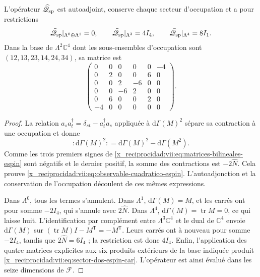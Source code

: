 \begin{proposition}
\label{x_reciprocidad:vii:prop:operador-espin-car}
L'opérateur \(\widehat{\mathscr Q}_{\rm sp}\) est autoadjoint,
conserve chaque secteur d'occupation et a pour restrictions
\begin{equation}
 \widehat{\mathscr Q}_{\rm sp}|_{\Lambda^0\oplus\Lambda^1}=0,
 \qquad
 \widehat{\mathscr Q}_{\rm sp}|_{\Lambda^3}=4I_4,
 \qquad
 \widehat{\mathscr Q}_{\rm sp}|_{\Lambda^4}=8I_1.
 \label{x_reciprocidad:vii:eq:sectores-espin-car}
\end{equation}
Dans la base de \(\Lambda^2\mathbb C^4\) dont les sous-ensembles d'occupation sont \((12,13,23,14,24,34)\), sa matrice est
\begin{equation}
 \begin{pmatrix}
 0&0&0&0&0&-4\\
 0&2&0&0&6&0\\
 0&0&2&-6&0&0\\
 0&0&-6&2&0&0\\
 0&6&0&0&2&0\\
 -4&0&0&0&0&0
 \end{pmatrix}.
 \label{x_reciprocidad:vii:eq:sector-dos-espin-car}
\end{equation}
\end{proposition}
\begin{proof}
La relation \(a_s a_t^\dagger=\delta_{st}-a_t^\dagger a_s\)
appliquée à \(\mathrm d\Gamma(M)^2\) sépare sa contraction à
une occupation et donne
\[
 :\!\mathrm d\Gamma(M)^2\!:
 =\mathrm d\Gamma(M)^2-\mathrm d\Gamma(M^2).
\]
Comme les trois premiers signes de
\eqref{x_reciprocidad:vii:eq:matrices-bilineales-espin} sont négatifs et le dernier
positif, la somme des contractions est \(-2\widehat N\).
Cela prouve \eqref{x_reciprocidad:vii:eq:observable-cuadratico-espin}.
L'autoadjonction et la conservation de l'occupation découlent de
ces mêmes expressions.

Dans \(\Lambda^0\), tous les termes s'annulent. Dans \(\Lambda^1\), \(\mathrm d\Gamma(M)=M\), et les carrés ont pour somme \(-2I_4\), qui s'annule avec \(2\widehat N\). Dans \(\Lambda^4\), \(\mathrm d\Gamma(M)=\operatorname{tr}M=0\), ce qui laisse huit. L'identification par complément entre \(\Lambda^3\mathbb C^4\) et le dual de \(\mathbb C^4\) envoie \(\mathrm d\Gamma(M)\) sur \((\operatorname{tr}M)I-M^{\mathsf T}=-M^{\mathsf T}\). Leurs carrés ont à nouveau pour somme \(-2I_4\), tandis que \(2\widehat N=6I_4\) ; la restriction est donc \(4I_4\). Enfin, l'application des quatre matrices explicites aux six produits extérieurs de la base indiquée produit \eqref{x_reciprocidad:vii:eq:sector-dos-espin-car}. L'opérateur est ainsi évalué dans les seize dimensions de \(\mathcal F\).
\end{proof}

